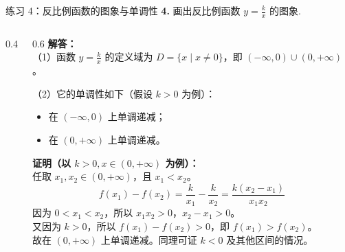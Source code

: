 \documentclass[aspectratio=169, 10pt]{beamer}
\begin{document}
	\begin{frame}{练习 4：反比例函数的图象与单调性}
		\textbf{\textcolor{myblue}{4.}} 画出反比例函数 \(y=\frac{k}{x}\) 的图象.
		\begin{columns}
			\begin{column}{0.4\textwidth}
			\end{column}
			\begin{column}{0.6\textwidth}
				\textbf{解答：}\\
				（1）函数 \(y=\frac{k}{x}\) 的定义域为 \(D=\{x \mid x \neq 0\}\)，即 \((-\infty, 0) \cup (0, +\infty)\)。
				
				\vspace{0.2cm}
				（2）它的单调性如下（假设 \(k>0\) 为例）：\\
				\begin{itemize}
					\item 在 \((-\infty, 0)\) 上单调递减；
					\item 在 \((0, +\infty)\) 上单调递减。
				\end{itemize}
				\textbf{证明（以 \(k>0, x \in (0, +\infty)\) 为例）：}\\
				任取 \(x_1, x_2 \in (0, +\infty)\)，且 \(x_1 < x_2\)。
				\[ f(x_1) - f(x_2) = \frac{k}{x_1} - \frac{k}{x_2} = \frac{k(x_2 - x_1)}{x_1x_2} \]
				因为 \(0 < x_1 < x_2\)，所以 \(x_1x_2 > 0\)，\(x_2 - x_1 > 0\)。\\
				又因为 \(k>0\)，所以 \(f(x_1) - f(x_2) > 0\)，即 \(f(x_1) > f(x_2)\)。\\
				故在 \((0, +\infty)\) 上单调递减。同理可证 \(k<0\) 及其他区间的情况。
			\end{column}
		\end{columns}
	\end{frame}
	
\end{document}
